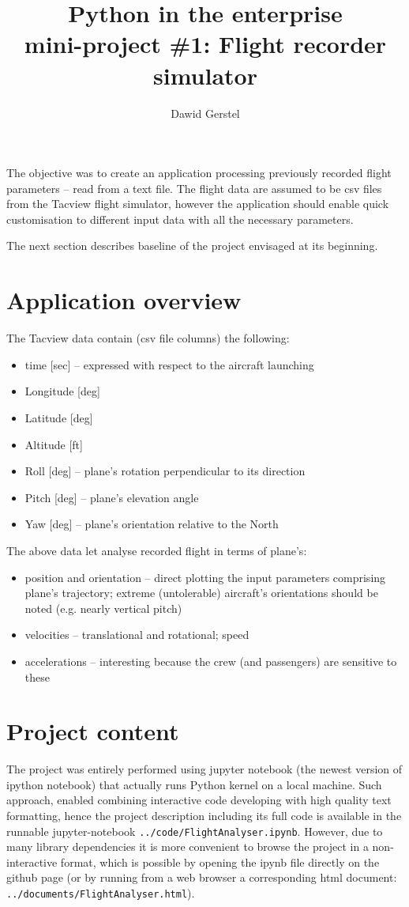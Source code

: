 \documentclass[a4paper,10pt]{article}
\title{\textbf{Python in the enterprise} \\ mini-project \#1: Flight recorder simulator}
\author{Dawid Gerstel}
\begin{document}
\maketitle

The objective was to create an application processing previously recorded flight parameters -- read from a text file. 
The flight data are assumed to be csv files from the Tacview flight simulator, however the application should enable quick customisation to different input data with all the necessary parameters.

The next section describes baseline of the project envisaged at its beginning.

\section{Application overview}
The Tacview data contain (csv file columns) the following:
\begin{itemize}
  \item time [sec] -- expressed with respect to the aircraft launching
  \item Longitude [deg]
  \item Latitude [deg]
  \item Altitude [ft]
  \item Roll [deg] -- plane's rotation perpendicular to its direction
  \item Pitch [deg] -- plane's elevation angle
  \item Yaw [deg] -- plane's orientation relative to the North
\end{itemize}

The above data let analyse recorded flight in terms of plane's:
\begin{itemize}
  \item position and orientation -- direct plotting the input parameters comprising plane's trajectory; extreme (untolerable) aircraft's orientations should be noted (e.g. nearly vertical pitch)
  \item velocities -- translational and rotational; speed
  \item accelerations -- interesting because the crew (and passengers) are sensitive to these
\end{itemize}

\section{Project content}

The project was entirely performed using jupyter notebook (the newest version of ipython notebook) that actually runs Python kernel on a local machine. Such approach, enabled combining interactive code developing with high quality text formatting, hence the project description including its full code is available in the runnable jupyter-notebook \texttt{../code/FlightAnalyser.ipynb}. However, due to many library dependencies it is more convenient to browse the project in a non-interactive format, which is possible by opening the ipynb file directly on the github page (or by running from a web browser a corresponding html document: \texttt{../documents/FlightAnalyser.html}).
\end{document}
